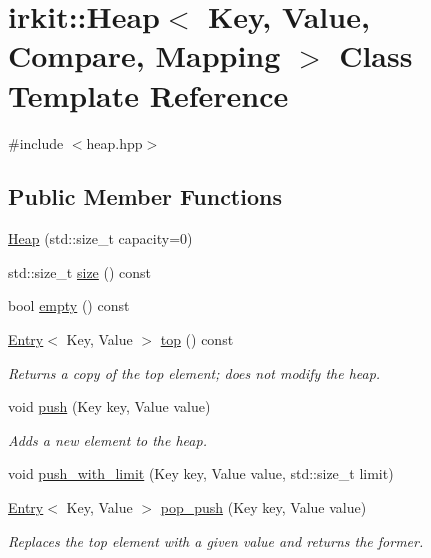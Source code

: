 \hypertarget{classirkit_1_1Heap}{}\section{irkit\+:\+:Heap$<$ Key, Value, Compare, Mapping $>$ Class Template Reference}
\label{classirkit_1_1Heap}


{\ttfamily \#include $<$heap.\+hpp$>$}

\subsection*{Public Member Functions}
\begin{DoxyCompactItemize}
\item 
\hyperlink{classirkit_1_1Heap_ac262b1efe6564321f3f8476dc8665eaf}{Heap} (std\+::size\+\_\+t capacity=0)
\item 
std\+::size\+\_\+t \hyperlink{classirkit_1_1Heap_acc53589d12325834624aa08573139227}{size} () const
\item 
bool \hyperlink{classirkit_1_1Heap_abb96822afb46391c107efef35e79256b}{empty} () const
\item 
\hyperlink{structirkit_1_1Entry}{Entry}$<$ Key, Value $>$ \hyperlink{classirkit_1_1Heap_aa14c398611006aa94e2fe24be3cf34ec}{top} () const
\begin{DoxyCompactList}\small\item\em Returns a copy of the top element; does not modify the heap. \end{DoxyCompactList}\item 
void \hyperlink{classirkit_1_1Heap_a8e2dfbd02e7411fe97281b5e7d19f12c}{push} (Key key, Value value)
\begin{DoxyCompactList}\small\item\em Adds a new element to the heap. \end{DoxyCompactList}\item 
void \hyperlink{classirkit_1_1Heap_ae4652d2601229e4de97f0321adf5f3c6}{push\+\_\+with\+\_\+limit} (Key key, Value value, std\+::size\+\_\+t limit)
\item 
\hyperlink{structirkit_1_1Entry}{Entry}$<$ Key, Value $>$ \hyperlink{classirkit_1_1Heap_aa94f791b5b26659cc41a39fd58d138e4}{pop\+\_\+push} (Key key, Value value)
\begin{DoxyCompactList}\small\item\em Replaces the top element with a given value and returns the former. \end{DoxyCompactList}\item 

\end{DoxyCompactItemize}
